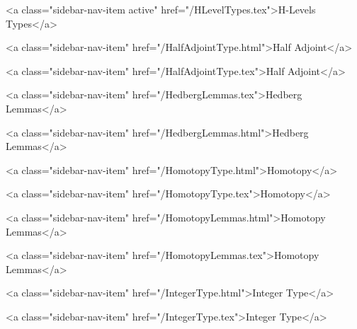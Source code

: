       
        
          <a class="sidebar-nav-item active" href="/HLevelTypes.tex">H-Levels Types</a>
        
      
    
      
        
          <a class="sidebar-nav-item" href="/HalfAdjointType.html">Half Adjoint</a>
        
      
    
      
        
          <a class="sidebar-nav-item" href="/HalfAdjointType.tex">Half Adjoint</a>
        
      
    
      
        
          <a class="sidebar-nav-item" href="/HedbergLemmas.tex">Hedberg Lemmas</a>
        
      
    
      
        
          <a class="sidebar-nav-item" href="/HedbergLemmas.html">Hedberg Lemmas</a>
        
      
    
      
        
          <a class="sidebar-nav-item" href="/HomotopyType.html">Homotopy</a>
        
      
    
      
        
          <a class="sidebar-nav-item" href="/HomotopyType.tex">Homotopy</a>
        
      
    
      
        
          <a class="sidebar-nav-item" href="/HomotopyLemmas.html">Homotopy Lemmas</a>
        
      
    
      
        
          <a class="sidebar-nav-item" href="/HomotopyLemmas.tex">Homotopy Lemmas</a>
        
      
    
      
        
          <a class="sidebar-nav-item" href="/IntegerType.html">Integer Type</a>
        
      
    
      
        
          <a class="sidebar-nav-item" href="/IntegerType.tex">Integer Type</a>
        
      
    
